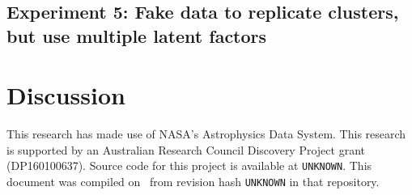 \documentclass{aastex61}
\newcommand{\githash}{UNKNOWN}
\newcommand{\giturl}{UNKNOWN}}
\begin{document}
\subsection{Experiment 5: Fake data to replicate clusters, but use multiple latent factors}

\section{Discussion}
\label{sec:discussion}


\acknowledgments

This research has made use of NASA's Astrophysics Data System.
This research is supported by an Australian Research Council Discovery Project
grant (DP160100637). 
Source code for this project is available at \texttt{\giturl}. This document
was compiled on \gitdate\ from revision hash \texttt{\githash} in that
repository. 


\end{document}
